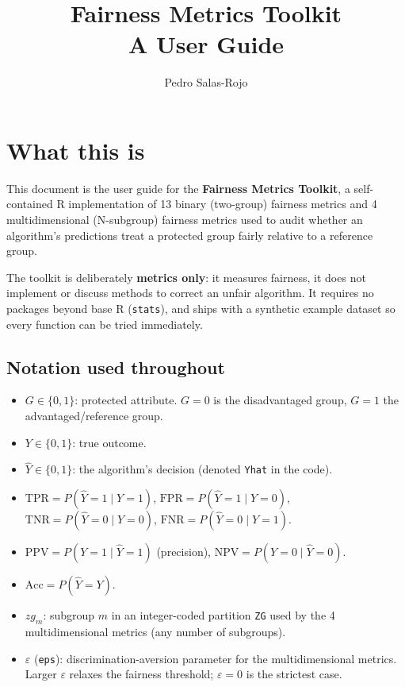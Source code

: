 \documentclass[11pt]{article}
\title{Fairness Metrics Toolkit \\ \large A User Guide}
\author{Pedro Salas-Rojo}
\date{}
\begin{document}
\maketitle

\section{What this is}

This document is the user guide for the \textbf{Fairness Metrics Toolkit}, a
self-contained R implementation of 13 binary (two-group) fairness metrics and
4 multidimensional (N-subgroup) fairness metrics used to audit whether an
algorithm's predictions treat a protected group fairly relative to a
reference group.

The toolkit is deliberately \textbf{metrics only}: it measures fairness, it
does not implement or discuss methods to correct an unfair algorithm. It
requires no packages beyond base R (\texttt{stats}), and ships with a
synthetic example dataset so every function can be tried immediately.

\subsection{Notation used throughout}

\begin{itemize}
  \item $G \in \{0,1\}$: protected attribute. $G=0$ is the disadvantaged
        group, $G=1$ the advantaged/reference group.
  \item $Y \in \{0,1\}$: true outcome.
  \item $\hat Y \in \{0,1\}$: the algorithm's decision (denoted \texttt{Yhat}
        in the code).
  \item $\mathrm{TPR} = P(\hat Y=1 \mid Y=1)$, $\mathrm{FPR} = P(\hat Y=1 \mid Y=0)$,
        $\mathrm{TNR} = P(\hat Y=0 \mid Y=0)$, $\mathrm{FNR} = P(\hat Y=0 \mid Y=1)$.
  \item $\mathrm{PPV} = P(Y=1 \mid \hat Y=1)$ (precision), $\mathrm{NPV} = P(Y=0 \mid \hat Y=0)$.
  \item $\mathrm{Acc} = P(\hat Y = Y)$.
  \item $zg_m$: subgroup $m$ in an integer-coded partition \texttt{ZG} used by
        the 4 multidimensional metrics (any number of subgroups).
  \item $\varepsilon$ (\texttt{eps}): discrimination-aversion parameter for the
        multidimensional metrics. Larger $\varepsilon$ relaxes the fairness
        threshold; $\varepsilon = 0$ is the strictest case.
\end{itemize}
\end{document}
